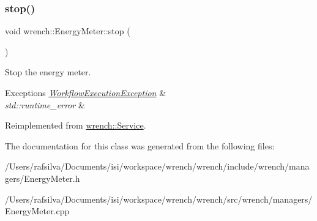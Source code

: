 \subsubsection{\texorpdfstring{stop()}{stop()}}
{\footnotesize\ttfamily void wrench\+::\+Energy\+Meter\+::stop (\begin{DoxyParamCaption}{ }\end{DoxyParamCaption})\hspace{0.3cm}{\ttfamily [virtual]}}



Stop the energy meter. 


\begin{DoxyExceptions}{Exceptions}
{\em \hyperlink{classwrench_1_1_workflow_execution_exception}{Workflow\+Execution\+Exception}} & \\
\hline
{\em std\+::runtime\+\_\+error} & \\
\hline
\end{DoxyExceptions}


Reimplemented from \hyperlink{classwrench_1_1_service_ac33a32f4758c6f51b27d2cfb9b46efda}{wrench\+::\+Service}.



The documentation for this class was generated from the following files\+:\begin{DoxyCompactItemize}
\item 
/\+Users/rafsilva/\+Documents/isi/workspace/wrench/wrench/include/wrench/managers/Energy\+Meter.\+h\item 
/\+Users/rafsilva/\+Documents/isi/workspace/wrench/wrench/src/wrench/managers/Energy\+Meter.\+cpp\end{DoxyCompactItemize}
